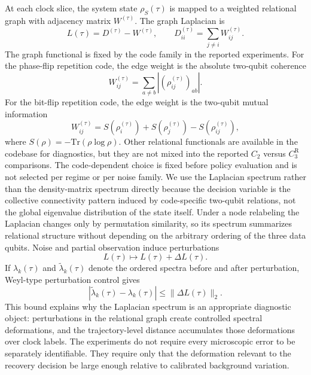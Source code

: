 \documentclass[11pt]{article}
\numberwithin{equation}{section}
\begin{document}
At each clock slice, the system state $\rho_S(\tau)$ is mapped to a weighted
relational graph with adjacency matrix $W^{(\tau)}$. The graph Laplacian is
\begin{equation}
L(\tau)=D^{(\tau)}-W^{(\tau)},
\qquad
D^{(\tau)}_{ii}=\sum_{j\neq i}W^{(\tau)}_{ij}.
\end{equation}
The graph functional is fixed by the code family in the reported experiments. For
the phase-flip repetition code, the edge weight is the absolute two-qubit
coherence
\begin{equation}
W_{ij}^{(\tau)}
=
\sum_{a\ne b}
\left|
\left(\rho_{ij}^{(\tau)}\right)_{ab}
\right|.
\end{equation}
For the bit-flip repetition code, the edge weight is the two-qubit mutual
information
\begin{equation}
W_{ij}^{(\tau)}
=
S(\rho_i^{(\tau)})
+S(\rho_j^{(\tau)})
-S(\rho_{ij}^{(\tau)}),
\end{equation}
where $S(\rho)=-\mathrm{Tr}(\rho\log\rho)$. Other relational functionals are
available in the codebase for diagnostics, but they are not mixed into the
reported $C_2$ versus $C_3^{\mathrm R}$ comparisons.
The code-dependent choice is fixed before policy evaluation and is not selected
per regime or per noise family.
We use the Laplacian spectrum rather than the density-matrix spectrum directly
because the decision variable is the collective connectivity pattern induced by
code-specific two-qubit relations, not the global eigenvalue distribution of the
state itself. Under a node relabeling the Laplacian changes only by permutation
similarity, so its spectrum summarizes relational structure without depending on
the arbitrary ordering of the three data qubits.
Noise and partial observation induce perturbations
\begin{equation}
L(\tau)\mapsto L(\tau)+\Delta L(\tau).
\end{equation}
If $\lambda_k(\tau)$ and $\tilde{\lambda}_k(\tau)$ denote the ordered spectra before
and after perturbation, Weyl-type perturbation control gives
\begin{equation}
|\tilde{\lambda}_k(\tau)-\lambda_k(\tau)|
\le
\|\Delta L(\tau)\|_2.
\end{equation}
This bound explains why the Laplacian spectrum is an appropriate diagnostic
object: perturbations in the relational graph create controlled spectral
deformations, and the trajectory-level distance accumulates those deformations
over clock labels. The experiments do not require every microscopic error to be
separately identifiable. They require only that the deformation relevant to the
recovery decision be large enough relative to calibrated background variation.
\end{document}
